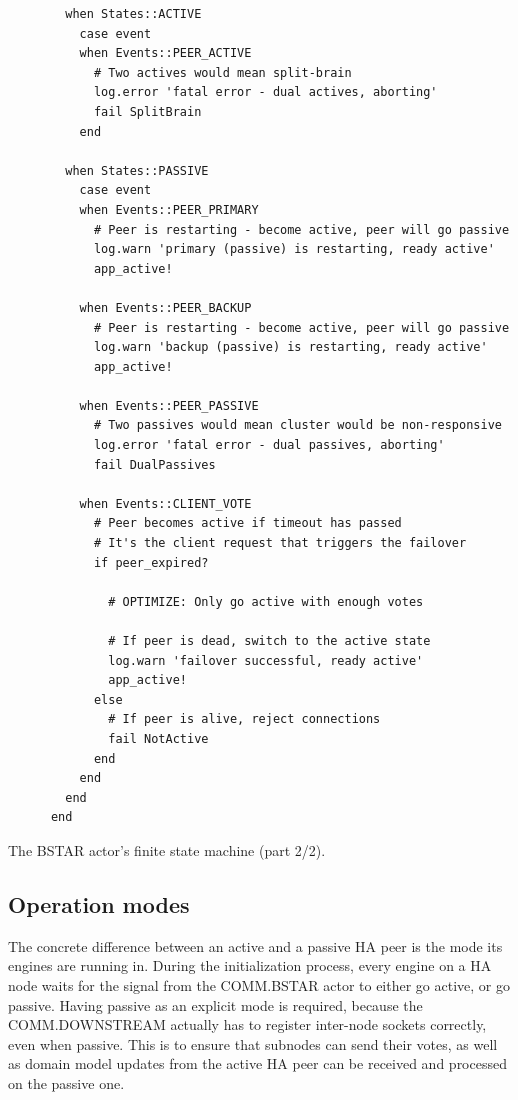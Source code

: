 \begin{listing}[H]
  \begin{verbatim}
        when States::ACTIVE
          case event
          when Events::PEER_ACTIVE
            # Two actives would mean split-brain
            log.error 'fatal error - dual actives, aborting'
            fail SplitBrain
          end

        when States::PASSIVE
          case event
          when Events::PEER_PRIMARY
            # Peer is restarting - become active, peer will go passive
            log.warn 'primary (passive) is restarting, ready active'
            app_active!

          when Events::PEER_BACKUP
            # Peer is restarting - become active, peer will go passive
            log.warn 'backup (passive) is restarting, ready active'
            app_active!

          when Events::PEER_PASSIVE
            # Two passives would mean cluster would be non-responsive
            log.error 'fatal error - dual passives, aborting'
            fail DualPassives

          when Events::CLIENT_VOTE
            # Peer becomes active if timeout has passed
            # It's the client request that triggers the failover
            if peer_expired?

              # OPTIMIZE: Only go active with enough votes

              # If peer is dead, switch to the active state
              log.warn 'failover successful, ready active'
              app_active!
            else
              # If peer is alive, reject connections
              fail NotActive
            end
          end
        end
      end
  \end{verbatim}
	\caption{The BSTAR actor's finite state machine (part 2/2).}
  \label{lst:approach:bstar:fsm_2}
\end{listing}


\subsection{Operation modes}
The concrete difference between an active and a passive HA peer is the mode its
engines are running in. During the initialization process, every engine on a HA
node waits for the signal from the COMM.BSTAR actor to either go active, or go
passive. Having passive as an explicit mode is required, because
the COMM.DOWNSTREAM actually has to register inter-node sockets
correctly, even when passive. This is to ensure that subnodes can send their
votes, as well as domain model updates from the active HA peer can be received and
processed on the passive one.

